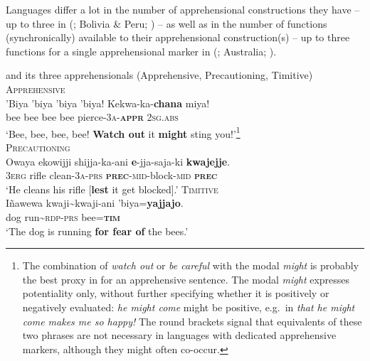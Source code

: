 \documentclass[output=paper,colorlinks,citecolor=brown]{langscibook}
\begin{document}
Languages differ a lot in the number of apprehensional constructions they have -- up to three in  (; Bolivia \& Peru; \cite{vuillermet2018a}) -- as well as in the number of functions (synchronically) available to their apprehensional construction(s) -- up to three functions for a single apprehensional marker in  (; Australia; \cite{green1989}).


\ea \label{ex:v1} \textnormal{ and its three apprehensionals (Apprehensive, Precautioning, Timitive)}
\ea \label{ex:v1a} \textnormal{\textsc{Apprehensive}} \\
\gll 'Biya 'biya 'biya 'biya! Kekwa-ka-\textbf{chana} miya! \\
bee bee bee bee pierce-\textsc{3a}-\textbf{\textsc{appr}} \textsc{2sg.abs} \\
\glt `Bee, bee, bee, bee! \textbf{Watch out} it \textbf{might} sting you!'\footnote{The combination of \textit{watch out} or \textit{be careful} with the modal \textit{might} is probably the best proxy in  for an apprehensive sentence. The modal \textit{might} expresses potentiality only, without further specifying whether it is positively or negatively evaluated: \textit{he might come} might be positive, e.g.\ in \textit{that he might come makes me so happy!} The round brackets signal that equivalents of these two phrases are not necessary in languages with dedicated apprehensive markers, although they might often co-occur.} \\
\ex \label{ex:v1b} \textnormal{\textsc{Precautioning}} \\
\gll Owaya ekowijji shijja-ka-ani {\ob}\textbf{e}-jja-saja-ki \textbf{kwajejje}{\cb}.\\
\textsc{3erg} rifle clean-\textsc{3a-prs} \textsc{\textbf{prec}-mid-}block-\textsc{mid} \textbf{\textsc{prec}} \\
\glt `He cleans his rifle [\textbf{lest} it get blocked].'
\newpage
\ex \label{ex:v1c} \textnormal{\textsc{Timitive}} \\
\gll Iñawewa kwaji\textasciitilde kwaji-ani 'biya=\textbf{yajjajo}. \\
dog run\textasciitilde\textsc{rdp-prs} bee=\textsc{\textbf{tim}} \\
\glt `The dog is running \textbf{for fear of} the bees.'
\z
\z
\end{document}

